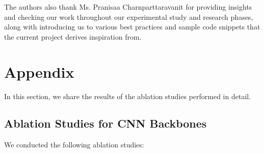 \documentclass[11pt]{article}
\begin{document}
The authors also thank Ms. Pranisaa Charnparttaravanit for providing insights and checking our work throughout our experimental study and research phases, along with introducing us to various best practices and sample code snippets that the current project derives inspiration from.
%
%


\appendix

\section{Appendix}
In this section, we share the results of the ablation studies performed in detail.
\subsection{Ablation Studies for CNN Backbones}
We conducted the following ablation studies:
\end{document}
